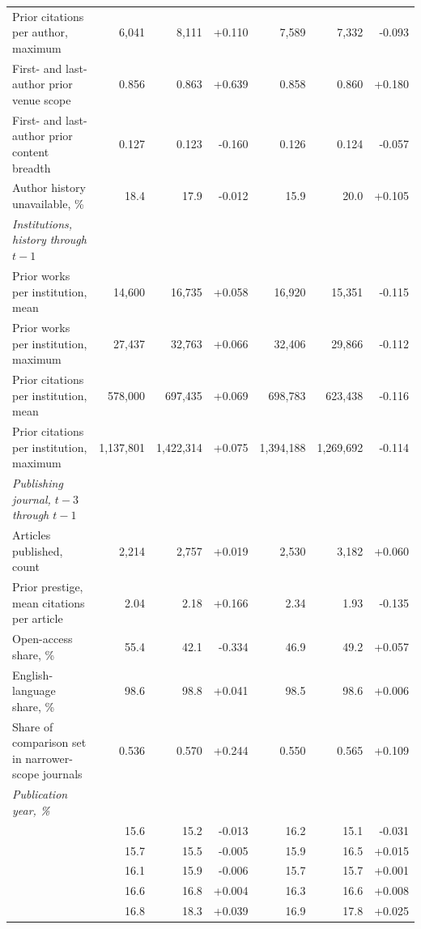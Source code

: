 \begin{table}[H]
\begin{tabular}{@{}lrrrrrr@{}}
\quad Prior citations per author, maximum & 6,041 & 8,111 & +0.110 & 7,589 & 7,332 & -0.093 \\
\quad First- and last-author prior venue scope & 0.856 & 0.863 & +0.639 & 0.858 & 0.860 & +0.180 \\
\quad First- and last-author prior content breadth & 0.127 & 0.123 & -0.160 & 0.126 & 0.124 & -0.057 \\
\quad Author history unavailable, \% & 18.4 & 17.9 & -0.012 & 15.9 & 20.0 & +0.105 \\
\addlinespace[3pt]\emph{Institutions, history through $t-1$} & & & & & & \\
\quad Prior works per institution, mean & 14,600 & 16,735 & +0.058 & 16,920 & 15,351 & -0.115 \\
\quad Prior works per institution, maximum & 27,437 & 32,763 & +0.066 & 32,406 & 29,866 & -0.112 \\
\quad Prior citations per institution, mean & 578,000 & 697,435 & +0.069 & 698,783 & 623,438 & -0.116 \\
\quad Prior citations per institution, maximum & 1,137,801 & 1,422,314 & +0.075 & 1,394,188 & 1,269,692 & -0.114 \\
\addlinespace[3pt]\emph{Publishing journal, $t-3$ through $t-1$} & & & & & & \\
\quad Articles published, count & 2,214 & 2,757 & +0.019 & 2,530 & 3,182 & +0.060 \\
\quad Prior prestige, mean citations per article & 2.04 & 2.18 & +0.166 & 2.34 & 1.93 & -0.135 \\
\quad Open-access share, \% & 55.4 & 42.1 & -0.334 & 46.9 & 49.2 & +0.057 \\
\quad English-language share, \% & 98.6 & 98.8 & +0.041 & 98.5 & 98.6 & +0.006 \\
\quad Share of comparison set in narrower-scope journals & 0.536 & 0.570 & +0.244 & 0.550 & 0.565 & +0.109 \\
\addlinespace[3pt]\emph{Publication year, \%} & & & & & & \\
\quad 2015 & 15.6 & 15.2 & -0.013 & 16.2 & 15.1 & -0.031 \\
\quad 2016 & 15.7 & 15.5 & -0.005 & 15.9 & 16.5 & +0.015 \\
\quad 2017 & 16.1 & 15.9 & -0.006 & 15.7 & 15.7 & +0.001 \\
\quad 2018 & 16.6 & 16.8 & +0.004 & 16.3 & 16.6 & +0.008 \\
\quad 2019 & 16.8 & 18.3 & +0.039 & 16.9 & 17.8 & +0.025 \\

\end{tabular}
\end{table}
